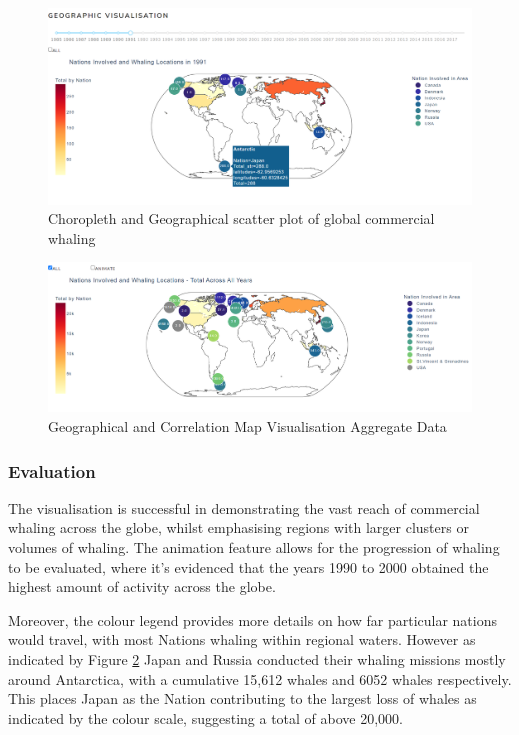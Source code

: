 \documentclass[12pt,a4paper]{article}
\begin{document}
\begin{figure}[H]
    \centering
    \includegraphics[width = 15cm]{FullChoro.png}
    \caption{Choropleth and Geographical scatter plot of global commercial whaling}
    \label{fig:scattergeo}
\end{figure}

\begin{figure}[H]
    \centering
    \includegraphics[width = 15cm]{fullChoroAll.png}
    \caption{Geographical and Correlation Map Visualisation Aggregate Data}
    \label{fig:fullChoroAll}
\end{figure}

\subsubsection{Evaluation}
The visualisation is successful in demonstrating the vast reach of commercial whaling across the globe, whilst emphasising regions  with larger clusters or volumes of whaling. The animation feature allows for the progression of whaling to be evaluated, where it's evidenced that the years 1990 to 2000 obtained the highest amount of activity across the globe. 

Moreover, the colour legend provides more details on how far particular nations would travel, with most Nations whaling within regional waters. However as indicated by Figure \ref{fig:fullChoroAll} Japan and Russia conducted their whaling missions mostly around Antarctica, with a cumulative 15,612 whales and 6052 whales respectively. This places Japan as the Nation contributing to the largest loss of whales as indicated by the colour scale, suggesting a total of above 20,000. 
\end{document}
